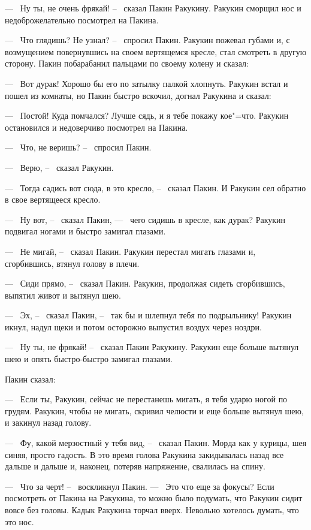 	---~ Ну ты, не очень фрякай! --~ сказал Пакин Ракукину. Ракукин
	сморщил нос и недоброжелательно посмотрел на Пакина.

	---~ Что  глядишь? Не узнал? --~ спросил Пакин. Ракукин пожевал губами и,
	с возмущением повернувшись на своем вертящемся кресле, стал смотреть в
	другую сторону. Пакин побарабанил пальцами по своему колену и сказал:

	---~ Вот дурак! Хорошо бы его по затылку палкой хлопнуть. Ракукин встал и
	пошел из комнаты, но Пакин быстро вскочил, догнал Ракукина и сказал:

	---~ Постой! Куда помчался? Лучше сядь, и я тебе покажу кое"=что. Ракукин
	остановился и недоверчиво посмотрел на Пакина.

	---~ Что, не веришь? --~ спросил Пакин.

	---~ Верю, --~ сказал Ракукин.

	---~ Тогда садись вот сюда, в это кресло, --~ сказал Пакин. И Ракукин сел
	обратно в свое вертящееся кресло.

	---~ Ну  вот, --~ сказал Пакин, ---~ чего сидишь в кресле, как дурак?
	Ракукин подвигал ногами и быстро замигал глазами.
	
	---~ Не мигай, --~ сказал Пакин. Ракукин перестал мигать глазами и,
	сгорбившись, втянул голову в плечи.
	
	---~ Сиди прямо, --~ сказал Пакин. Ракукин, продолжая сидеть сгорбившись,
	выпятил живот и вытянул шею.
	
	---~ Эх, --~ сказал Пакин, --~ так бы и шлепнул тебя по подрыльнику!
	Ракукин икнул, надул щеки и потом  осторожно выпустил воздух через ноздри.

	---~ Ну ты, не фрякай! --~ сказал Пакин Ракукину. Ракукин еще больше	
	вытянул шею  и  опять быстро-быстро замигал глазами. 
	
	Пакин сказал:

	---~ Если ты, Ракукин, сейчас не перестанешь мигать, я тебя ударю ногой по
	грудям. Ракукин, чтобы не мигать, скривил челюсти и еще больше вытянул шею,
	и закинул назад голову.
	
	---~ Фу, какой мерзостный у тебя  вид, --~ сказал Пакин. Морда как у
	курицы, шея синяя, просто гадость. В это время голова Ракукина закидывалась
	назад все дальше и дальше и, наконец, потеряв напряжение, свалилась на
	спину.
    
	---~ Что за черт! --~ воскликнул Пакин. ---~ Это что еще за фокусы?
	Если посмотреть от Пакина на Ракукина, то можно было подумать, что Ракукин
	сидит вовсе без головы. Кадык Ракукина торчал вверх. Невольно хотелось
	думать, что это нос.
	
